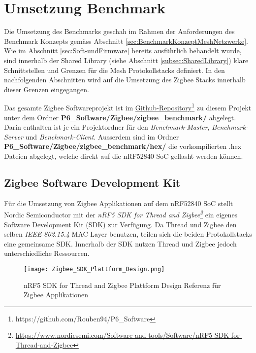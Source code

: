 \clearpage

\section{Umsetzung Benchmark}\label{sec:ZigbeeUmsetzungBenchmark}
Die Umsetzung des Benchmarks geschah im Rahmen der Anforderungen des Benchmark Konzepts gemäss Abschnitt \ref{sec:BenchmarkKonzeptMeshNetzwerke}.
Wie im Abschnitt \ref{sec:Soft-undFirmware} bereits ausführlich behandelt wurde, sind innerhalb der Shared Library (siehe Abschnitt \ref{subsec:SharedLibrary}) klare Schnittstellen und Grenzen für die Mesh Protokollstacks definiert.
In den nachfolgenden Abschnitten wird auf die Umsetzung des Zigbee Stacks innerhalb dieser Grenzen eingegangen.

Das gesamte Zigbee Softwareprojekt ist im \href{https://github.com/Rouben94/P6_Software}{Github-Repository\footnote{\url{https://github.com/Rouben94/P6_Software}\cite{anklin_bobst_horath_rouben94p6_software_nodate}}} zu diesem Projekt unter dem Ordner \textbf{P6\_Software/Zigbee/zigbee\_benchmark/} abgelegt.
Darin enthalten ist je ein Projektordner für den \textit{Benchmark-Master}, \textit{Benchmark-Server} und \textit{Benchmark-Client}.
Ausserdem sind im Ordner \textbf{P6\_Software/Zigbee/zigbee\_benchmark/hex/} die vorkompilierten .hex Dateien abgelegt, welche direkt auf die nRF52840 SoC geflasht werden können. 

\subsection{Zigbee Software Development Kit}\label{subsec:ZigbeeSoftwareDevelopmentKit}
Für die Umsetzung von Zigbee Applikationen auf dem nRF52840 SoC stellt Nordic Semiconductor mit der \textit{nRF5 SDK for Thread and Zigbee\footnote{\url{https://www.nordicsemi.com/Software-and-tools/Software/nRF5-SDK-for-Thread-and-Zigbee}\cite{nordic_semi_nrf_sdk_for_thread_and_zigbee_2020}}} ein eigenes Software Development Kit (SDK) zur Verfügung.
Da Thread und Zigbee den selben \textit{IEEE 802.15.4} MAC Layer benutzen, teilen sich die beiden Protokollstacks eine gemeinsame SDK.
Innerhalb der SDK nutzen Thread und Zigbee jedoch unterschiedliche Ressourcen.

\begin{figure}[h]
	\centering
	\texttt{[image: Zigbee\_SDK\_Plattform\_Design.png]}
	\caption{nRF5 SDK for Thread and Zigbee Plattform Design Referenz für Zigbee Applikationen \cite{nordic_semi_nrf_sdk_for_thread_and_zigbee_2020}}
	\label{fig:ZigbeePlattformDesign}
\end{figure}

